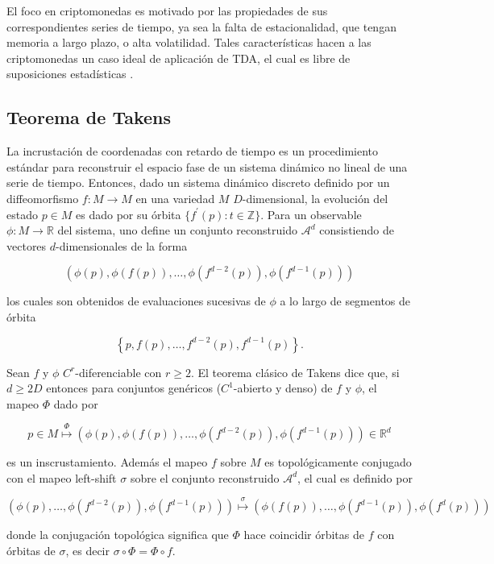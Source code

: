 El foco en criptomonedas es motivado por las propiedades de sus correspondientes series de tiempo, ya sea la falta de estacionalidad, que tengan memoria a largo plazo, o alta volatilidad. Tales características hacen a las criptomonedas un caso ideal de aplicación de TDA, el cual es libre de suposiciones estadísticas \parencite{gideaTopologicalRecognitionCritical2020}.

\subsection{Teorema de Takens}

La incrustación de coordenadas con retardo de tiempo es un procedimiento estándar para reconstruir el espacio fase de un sistema dinámico no lineal de una serie de tiempo. Entonces, dado un sistema dinámico discreto definido por un diffeomorfismo $f:M \to M$ en una variedad $M$ $D$-dimensional, la evolución del estado $p\in M$ es dado por su órbita $\mbox{\{$f^{\prime}(p):t\in \mathbb{Z}\}$}$. Para un observable $\phi:M \to \mathbb{R}$ del sistema, uno define un conjunto reconstruido $\mathcal{A}^d$ consistiendo de vectores $d$-dimensionales de la forma  

\[
\left(\phi(p), \phi(f(p)), \ldots, \phi\left(f^{d-2}(p)\right), \phi\left(f^{d-1}(p)\right)\right)
\]

los cuales son obtenidos de evaluaciones sucesivas de $\phi$ a lo largo de segmentos de órbita

\[
\left\{p, f(p), \ldots, f^{d-2}(p), f^{d-1}(p)\right\}.
\]

Sean $f$ y $\phi$ $C^r$-diferenciable con $r\geq 2$. El teorema clásico de Takens dice que, si $d\geq 2D$ entonces para conjuntos genéricos ($C^1$-abierto y denso) de $f$ y $\phi$, el mapeo $\Phi$ dado por

\[
p \in M \stackrel{\Phi}{\mapsto}\left(\phi(p), \phi(f(p)), \ldots, \phi\left(f^{d-2}(p)\right), \phi\left(f^{d-1}(p)\right)\right) \in \mathbb{R}^{d}
\]

es un inscrustamiento. Además el mapeo $f$ sobre $M$ es topológicamente conjugado con el mapeo left-shift $\sigma$ sobre el conjunto reconstruido $\mathcal{A}^d$, el cual es definido por

\[
\left(\phi(p), \ldots, \phi\left(f^{d-2}(p)\right), \phi\left(f^{d-1}(p)\right)\right) \stackrel{\sigma}{\mapsto}\left(\phi(f(p)), \ldots, \phi\left(f^{d-1}(p)\right), \phi\left(f^{d}(p)\right)\right)
\]

donde la conjugación topológica significa que $\Phi$ hace coincidir órbitas de $f$ con órbitas de $\sigma$, es decir $\sigma \circ \Phi = \Phi \circ f$.
   
